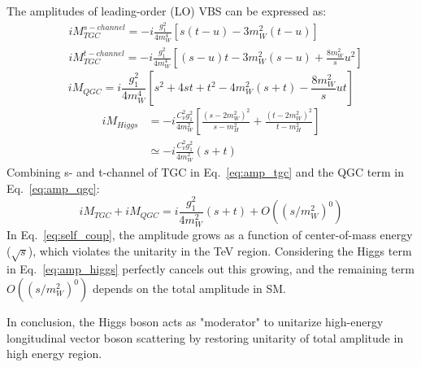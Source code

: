 The amplitudes of leading-order (LO) VBS can be expressed as\cite{PhysRevD.87.093005}:
\begin{equation} \label{eq:amp_tgc}
\begin{split}
	& {iM}_{TGC}^{s-channel} = -i\frac{g_{1}^{2}}{4m_{W}^{4}}[s(t-u)-3m_{W}^{2}(t-u)] \\
	& {iM}_{TGC}^{t-channel} = -i\frac{g_{1}^{2}}{4m_{W}^{4}}\left[(s-u)t-3m_{W}^{2}(s-u)+\frac{8m_{W}^{2}}{s}u^{2}\right]
\end{split}
\end{equation}
\begin{equation} \label{eq:amp_qgc}
	{iM}_{QGC} = i\frac{g_{1}^{2}}{4m_{W}^{4}}\left[s^{2}+4st+t^{2}-4m_{W}^{2}(s+t)-\frac{8m_{W}^{2}}{s}ut\right]
\end{equation}
\begin{equation} \label{eq:amp_higgs}
\begin{split}
	{iM}_{Higgs} & = -i\frac{C_{\nu}^{2}g_{1}^{2}}{4m_{W}^{2}}\left[\frac{(s-2m_{W}^{2})^{2}}{s-m_{H}^{2}} + \frac{(t-2m_{W}^{2})^{2}}{t-m_{H}^{2}}\right] \\
                     & \simeq -i\frac{C_{\nu}^{2}g_{1}^{2}}{4m_{W}^{2}}(s+t)
\end{split}
\end{equation}
Combining s- and t-channel of TGC in Eq.~\ref{eq:amp_tgc} and the QGC term in Eq.~\ref{eq:amp_qgc}:
\begin{equation} \label{eq:self_coup}
	{iM}_{TGC} + {iM}_{QGC}= i\frac{g_{1}^{2}}{4m_{W}^{2}}(s+t) + {O}((s/m_{W}^{2})^{0})
\end{equation}
In Eq.~\ref{eq:self_coup}, the amplitude grows as a function of center-of-mass energy ($\sqrt{s}$),
which violates the unitarity in the TeV region.
Considering the Higgs term in Eq.~\ref{eq:amp_higgs} perfectly cancels out this growing,
and the remaining term ${O}((s/m_{W}^{2})^{0})$ depends on the total amplitude in SM.

In conclusion, the Higgs boson acts as "moderator" to unitarize high-energy longitudinal vector boson scattering
by restoring unitarity of total amplitude in high energy region.

